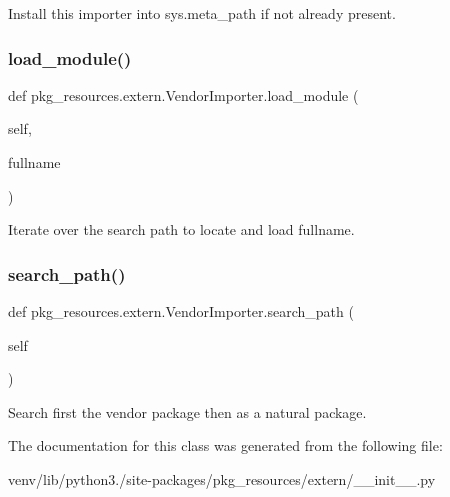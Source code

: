 \begin{DoxyVerb}Install this importer into sys.meta_path if not already present.
\end{DoxyVerb}
 \mbox{\label{classpkg__resources_1_1extern_1_1_vendor_importer_aa34920cbe53734c059a0565d5403aebc}} 
\subsubsection{\texorpdfstring{load\+\_\+module()}{load\_module()}}
{\footnotesize\ttfamily def pkg\+\_\+resources.\+extern.\+Vendor\+Importer.\+load\+\_\+module (\begin{DoxyParamCaption}\item[{}]{self,  }\item[{}]{fullname }\end{DoxyParamCaption})}

\begin{DoxyVerb}Iterate over the search path to locate and load fullname.
\end{DoxyVerb}
 \mbox{\label{classpkg__resources_1_1extern_1_1_vendor_importer_a52bda559ea3f43c176fc4c50b084c5a8}} 
\subsubsection{\texorpdfstring{search\+\_\+path()}{search\_path()}}
{\footnotesize\ttfamily def pkg\+\_\+resources.\+extern.\+Vendor\+Importer.\+search\+\_\+path (\begin{DoxyParamCaption}\item[{}]{self }\end{DoxyParamCaption})}

\begin{DoxyVerb}Search first the vendor package then as a natural package.
\end{DoxyVerb}
 

The documentation for this class was generated from the following file\+:\begin{DoxyCompactItemize}
\item 
venv/lib/python3./site-\/packages/pkg\+\_\+resources/extern/\+\_\+\+\_\+init\+\_\+\+\_\+.\+py\end{DoxyCompactItemize}
